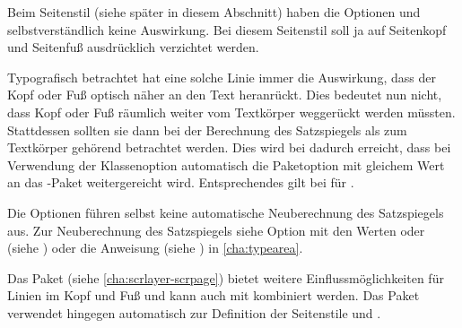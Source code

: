 Beim Seitenstil %
 (siehe später in
diesem Abschnitt) haben die Optionen  und
 selbstverständlich keine Auswirkung. Bei diesem
Seitenstil soll ja auf Seitenkopf und
Seitenfuß ausdrücklich verzichtet werden.

Typografisch betrachtet hat eine solche Linie immer
die Auswirkung, dass der Kopf oder Fuß optisch näher an den Text heranrückt.
Dies bedeutet nun nicht, dass Kopf oder Fuß räumlich weiter vom
Textkörper weggerückt werden müssten.  Stattdessen sollten
sie dann bei der Berechnung des Satzspiegels als zum Textkörper gehörend
betrachtet werden. Dies wird bei  dadurch erreicht, dass bei
Verwendung der Klassenoption  automatisch die Paketoption
%
 mit gleichem Wert an das
\hyperref[cha:typearea]{}-Paket weitergereicht
wird. Entsprechendes gilt bei  für
%
.

Die Optionen führen selbst keine automatische Neuberechnung des Satzspiegels
aus. Zur Neuberechnung des Satzspiegels siehe Option
 mit den Werten  oder
 (siehe ) oder die
Anweisung  (siehe
) in \autoref{cha:typearea}.

Das Paket \hyperref[cha:scrlayer-scrpage]{}%
%
 (siehe
\autoref{cha:scrlayer-scrpage}) bietet weitere Einflussmöglichkeiten für
Linien im Kopf und Fuß und kann auch mit  kombiniert
werden. Das Paket  verwendet hingegen automatisch
 zur
Definition der Seitenstile  und
.

